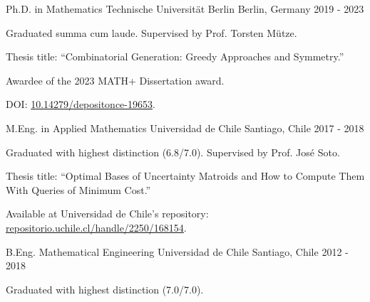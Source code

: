 

\begin{cventries}

  \cventry
    {Ph.D. in Mathematics} %
    {Technische Universität Berlin} %
    {Berlin, Germany} %
    {2019 - 2023} %
    {%
    \begin{cvitems}
      \item Graduated summa cum laude.
      Supervised by Prof. Torsten Mütze.
      \item[] Thesis title: ``Combinatorial Generation: Greedy Approaches and Symmetry.''
      \item[] Awardee of the 2023 MATH+ Dissertation award.
      \item[] DOI: \href{https://doi.org/10.14279/depositonce-19653}{10.14279/depositonce-19653}.
    \end{cvitems}
}
  
  \cventry
    {M.Eng. in Applied Mathematics} %
    {Universidad de Chile} %
    {Santiago, Chile} %
    {2017 - 2018} %
    {
      \begin{cvitems}
      \item Graduated with highest distinction (6.8/7.0). Supervised by Prof. José Soto. 
      \item[] Thesis title: ``Optimal Bases of Uncertainty Matroids and How to Compute Them With Queries of Minimum Cost.''
      \item[] Available at Universidad de Chile's repository: \href{https://repositorio.uchile.cl/handle/2250/168154}{repositorio.uchile.cl/handle/2250/168154}.
      \end{cvitems}
    }
  
  \cventry
    {B.Eng. Mathematical Engineering} %
    {Universidad de Chile} %
    {Santiago, Chile} %
    {2012 - 2018} %
    {
      \begin{cvitems}
        \item Graduated with highest distinction (7.0/7.0). 
      \end{cvitems}
    }
\end{cventries}
